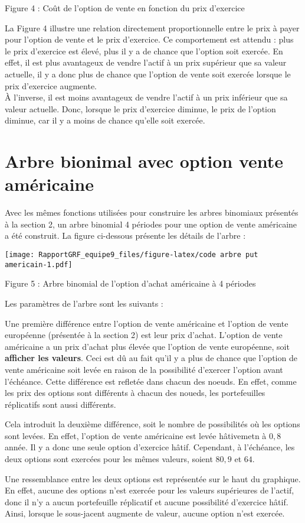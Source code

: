 \documentclass[
]{article}
\begin{document}
\begin{center}
\textsf{Figure 4 : Coût de l'option de vente en fonction du prix d'exercice}
\end{center}

La Figure 4 illustre une relation directement proportionnelle entre le
prix à payer pour l'option de vente et le prix d'exercice. Ce
comportement est attendu : plus le prix d'exercice est élevé, plus il y
a de chance que l'option soit exercée. En effet, il est plus avantageux
de vendre l'actif à un prix supérieur que sa valeur actuelle, il y a
donc plus de chance que l'option de vente soit exercée lorsque le prix
d'exercice augmente.\\
À l'inverse, il est moins avantageux de vendre l'actif à un prix
inférieur que sa valeur actuelle. Donc, lorsque le prix d'exercice
diminue, le prix de l'option diminue, car il y a moins de chance qu'elle
soit exercée.

\newpage

\section{Arbre bionimal avec option vente
américaine}\label{arbre-bionimal-avec-option-vente-amuxe9ricaine}

Avec les mêmes fonctions utilisées pour construire les arbres binomiaux
présentés à la section 2, un arbre binomial 4 périodes pour une option
de vente américaine a été construit. La figure ci-dessous présente les
détails de l'arbre :

\texttt{[image: RapportGRF\_equipe9\_files/figure-latex/code arbre put americain-1.pdf]}

\begin{center}
\textsf{Figure 5 : Arbre binomial de l'option d'achat américaine à 4 périodes}
\end{center}

Les paramètres de l'arbre sont les suivants :

Une première différence entre l'option de vente américaine et l'option
de vente européenne (présentée à la section 2) est leur prix d'achat.
L'option de vente américaine a un prix d'achat plus élevée que l'option
de vente européenne, soit \textbf{afficher les valeurs}. Ceci est dû au
fait qu'il y a plus de chance que l'option de vente américaine soit
levée en raison de la possibilité d'exercer l'option avant l'échéance.
Cette différence est refletée dans chacun des noeuds. En effet, comme
les prix des options sont différents à chacun des noueds, les
portefeuilles réplicatifs sont aussi différents.

Cela introduit la deuxième différence, soit le nombre de possibilités où
les options sont levées. En effet, l'option de vente américaine est
levée hâtivemetn à \(0,8\) année. Il y a donc une seule option
d'exercice hâtif. Cependant, à l'échéance, les deux options sont
exercées pour les mêmes valeurs, soient \(80,9\) et \(64\).

Une ressemblance entre les deux options est représentée sur le haut du
graphique. En effet, aucune des options n'est exercée pour les valeurs
supérieures de l'actif, donc il n'y a aucun portefeuille réplicatif et
aucune possibilité d'exercice hâtif. Ainsi, lorsque le sous-jacent
augmente de valeur, aucune option n'est exercée.
\end{document}
